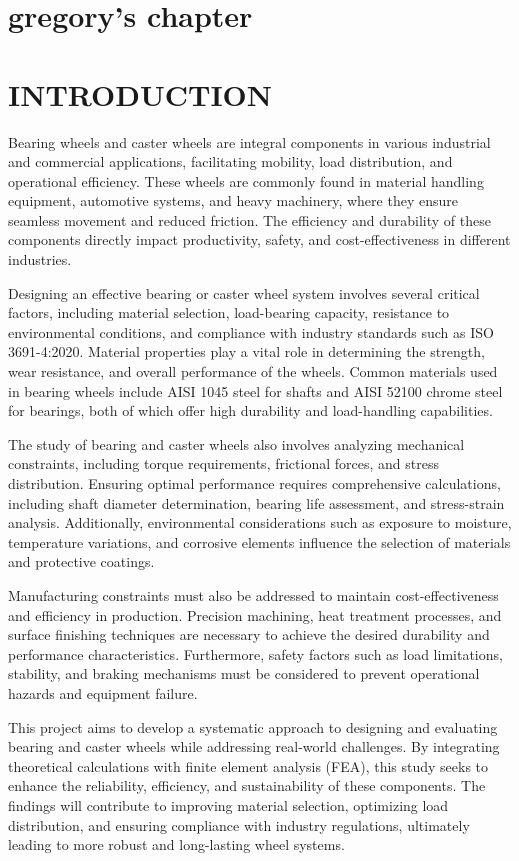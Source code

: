 \documentclass[../../main]{subfiles}
\begin{document}
\section{gregory's chapter}

\section{INTRODUCTION}

Bearing wheels and caster wheels are integral components in various
industrial and commercial applications, facilitating mobility, load
distribution, and operational efficiency. These wheels are commonly
found in material handling equipment, automotive systems, and heavy
machinery, where they ensure seamless movement and reduced friction. The
efficiency and durability of these components directly impact
productivity, safety, and cost-effectiveness in different industries.

Designing an effective bearing or caster wheel system involves several
critical factors, including material selection, load-bearing capacity,
resistance to environmental conditions, and compliance with industry
standards such as ISO 3691-4:2020. Material properties play a vital role
in determining the strength, wear resistance, and overall performance of
the wheels. Common materials used in bearing wheels include AISI 1045
steel for shafts and AISI 52100 chrome steel for bearings, both of which
offer high durability and load-handling capabilities.

The study of bearing and caster wheels also involves analyzing
mechanical constraints, including torque requirements, frictional
forces, and stress distribution. Ensuring optimal performance requires
comprehensive calculations, including shaft diameter determination,
bearing life assessment, and stress-strain analysis. Additionally,
environmental considerations such as exposure to moisture, temperature
variations, and corrosive elements influence the selection of materials
and protective coatings.

Manufacturing constraints must also be addressed to maintain
cost-effectiveness and efficiency in production. Precision machining,
heat treatment processes, and surface finishing techniques are necessary
to achieve the desired durability and performance characteristics.
Furthermore, safety factors such as load limitations, stability, and
braking mechanisms must be considered to prevent operational hazards and
equipment failure.

This project aims to develop a systematic approach to designing and
evaluating bearing and caster wheels while addressing real-world
challenges. By integrating theoretical calculations with finite element
analysis (FEA), this study seeks to enhance the reliability, efficiency,
and sustainability of these components. The findings will contribute to
improving material selection, optimizing load distribution, and ensuring
compliance with industry regulations, ultimately leading to more robust
and long-lasting wheel systems.
\end{document}

